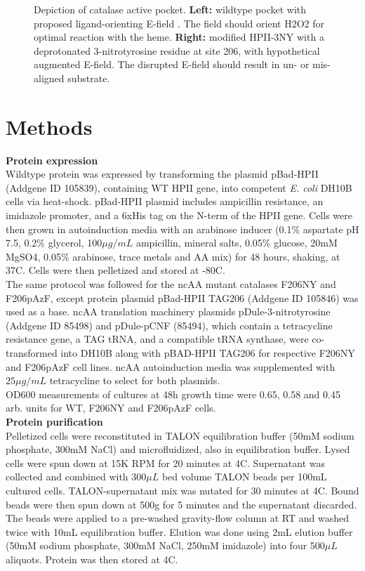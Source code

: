 \documentclass[journal=jacsat,manuscript=article]{achemso}
\begin{document}
\begin{figure}
  \caption{Depiction of catalase active pocket. \textbf{Left:} wildtype pocket with proposed ligand-orienting E-field \cite{electricpotential}. The field should orient H2O2 for optimal reaction with the heme. \textbf{Right:} modified HPII-3NY with a deprotonated 3-nitrotyrosine residue at site 206, with hypothetical augmented E-field. The disrupted E-field should result in un- or mis-aligned substrate.}
  \label{fig:hypothesis}
\end{figure}

\section{Methods}
\textbf{Protein expression}\\
Wildtype protein was expressed by transforming the plasmid pBad-HPII (Addgene ID 105839), containing WT HPII gene, into competent \textit{E. coli} DH10B cells via heat-shock. pBad-HPII plasmid includes ampicillin resistance, an imidazole promoter, and a 6xHis tag on the N-term of the HPII gene. Cells were then grown in autoinduction media with an arabinose inducer (0.1\% aspartate pH 7.5, 0.2\% glycerol, 100$\mu g / mL$ ampicillin, mineral salts, 0.05\% glucose, 20mM MgSO4, 0.05\% arabinose, trace metals and AA mix) for 48 hours, shaking, at 37C. Cells were then pelletized and stored at -80C.\\

The same protocol was followed for the ncAA mutant catalases F206NY and F206pAzF, except protein plasmid pBad-HPII TAG206 (Addgene ID 105846) was used as a base. ncAA translation machinery plasmids pDule-3-nitrotyrosine (Addgene ID 85498) and pDule-pCNF (85494), which contain a tetracycline resistance gene, a TAG tRNA, and a compatible tRNA synthase, were co-transformed into DH10B along with pBAD-HPII TAG206 for respective F206NY and F206pAzF cell lines. ncAA autoinduction media was supplemented with $25\mu g / mL$ tetracycline to select for both plasmids.\\

OD600 measurements of cultures at 48h growth time were 0.65, 0.58 and 0.45 arb. units for WT, F206NY and F206pAzF cells.\\

\textbf{Protein purification}\\
Pelletized cells were reconstituted in TALON equilibration buffer (50mM sodium phosphate, 300mM NaCl) and microfluidized, also in equilibration buffer. Lysed cells were spun down at 15K RPM for 20 minutes at 4C. Supernatant was collected and combined with 300$\mu L$ bed volume TALON beads per 100mL cultured cells. TALON-supernatant mix was nutated for 30 minutes at 4C. Bound beads were then spun down at 500g for 5 minutes and the supernatant discarded. The beads were applied to a pre-washed gravity-flow column at RT and washed twice with 10mL equilibration buffer. Elution was done using 2mL elution buffer (50mM sodium phosphate, 300mM NaCl, 250mM imidazole) into four 500$\mu L$ aliquots. Protein was then stored at 4C.\\
\end{document}
